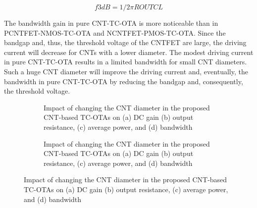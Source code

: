\begin{equation}
  f3dB = 1/2πROUTCL
  \label{eq:9}
\end{equation}

The bandwidth gain in pure CNT-TC-OTA is more noticeable than in
PCNTFET-NMOS-TC-OTA and NCNTFET-PMOS-TC-OTA. Since the bandgap and, thus, the
threshold voltage of the CNTFET are large, the driving current will decrease for
CNTs with a lower diameter. The modest driving current in pure CNT-TC-OTA
results in a limited bandwidth for small CNT diameters. Such a huge CNT diameter
will improve the driving current and, eventually, the bandwidth in pure
CNT-TC-OTA by reducing the bandgap and, consequently, the threshold voltage.

\begin{figure}[htbp]
  \centering
  \begin{subfigure}[b]{0.48\linewidth}
    \centering
    \caption{Impact of changing the CNT diameter in the proposed CNT-based TC-OTAs on (a) DC gain (b) output resistance, (c) average power, and (d) bandwidth}

  \end{subfigure}
  \hfill
  \begin{subfigure}[b]{0.48\linewidth}
    \centering
    \caption{Impact of changing the CNT diameter in the proposed CNT-based TC-OTAs on (a) DC gain (b) output resistance, (c) average power, and (d) bandwidth}

  \end{subfigure}
  \caption{Impact of changing the CNT diameter in the proposed CNT-based TC-OTAs on (a) DC gain (b) output resistance, (c) average power, and (d) bandwidth}

  \label{fig:group_uoudr}
\end{figure}

